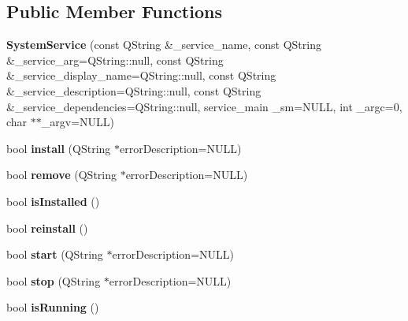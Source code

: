 \subsection*{Public Member Functions}
\begin{DoxyCompactItemize}
\item 
\hypertarget{class_system_service_a8e6d9057c5b084217ebe00098d66dd13}{{\bfseries System\-Service} (const Q\-String \&\-\_\-service\-\_\-name, const Q\-String \&\-\_\-service\-\_\-arg=Q\-String\-::null, const Q\-String \&\-\_\-service\-\_\-display\-\_\-name=Q\-String\-::null, const Q\-String \&\-\_\-service\-\_\-description=Q\-String\-::null, const Q\-String \&\-\_\-service\-\_\-dependencies=Q\-String\-::null, service\-\_\-main \-\_\-sm=N\-U\-L\-L, int \-\_\-argc=0, char $\ast$$\ast$\-\_\-argv=N\-U\-L\-L)}\label{class_system_service_a8e6d9057c5b084217ebe00098d66dd13}

\item 
\hypertarget{class_system_service_a7e2d5e306ebe477ae912af62d1d33f64}{bool {\bfseries install} (Q\-String $\ast$error\-Description=N\-U\-L\-L)}\label{class_system_service_a7e2d5e306ebe477ae912af62d1d33f64}

\item 
\hypertarget{class_system_service_a785360539331618e97da26f5bf8e7986}{bool {\bfseries remove} (Q\-String $\ast$error\-Description=N\-U\-L\-L)}\label{class_system_service_a785360539331618e97da26f5bf8e7986}

\item 
\hypertarget{class_system_service_acc5206dcbece30a5274bccda08f61eae}{bool {\bfseries is\-Installed} ()}\label{class_system_service_acc5206dcbece30a5274bccda08f61eae}

\item 
\hypertarget{class_system_service_a77088380f6648923d61bd463a6e47e71}{bool {\bfseries reinstall} ()}\label{class_system_service_a77088380f6648923d61bd463a6e47e71}

\item 
\hypertarget{class_system_service_acf9289ae7719eeb0973500b6ccef9a4d}{bool {\bfseries start} (Q\-String $\ast$error\-Description=N\-U\-L\-L)}\label{class_system_service_acf9289ae7719eeb0973500b6ccef9a4d}

\item 
\hypertarget{class_system_service_a8bc07f9639b9e494f396c77f17fee7a2}{bool {\bfseries stop} (Q\-String $\ast$error\-Description=N\-U\-L\-L)}\label{class_system_service_a8bc07f9639b9e494f396c77f17fee7a2}

\item 
\hypertarget{class_system_service_ab824ba0600a5402eaa87e83921b9342b}{bool {\bfseries is\-Running} ()}\label{class_system_service_ab824ba0600a5402eaa87e83921b9342b}


\end{DoxyCompactItemize}
